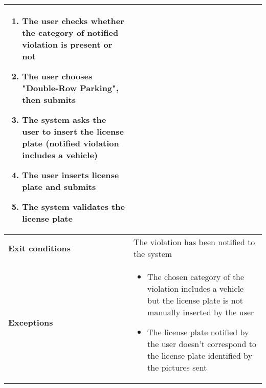 \begin{description}
\begin{center}
\begin{tabular}{|p{3cm}|p{7cm}|}
\begin{enumerate}
                \item The user checks whether the category of notified violation is present or not
                \item The user chooses "Double-Row Parking", then submits
                \item The system asks the user to insert the license plate (notified violation includes a vehicle) 
                \item The user inserts license plate and submits 
                \item The system validates the license plate
            \end{enumerate} \\
            \hline
            \textbf{Exit conditions} & The violation has been notified to the system \\
            \hline
            \textbf{Exceptions}
            & \begin{itemize}
                \item The chosen category of the violation includes a vehicle but the license plate is not manually inserted by the user
                \item The license plate notified by the user doesn't correspond to the license plate identified by the pictures sent 
            \end{itemize} \\
            \hline
        \end{tabular}
    \end{center}
\end{description}

